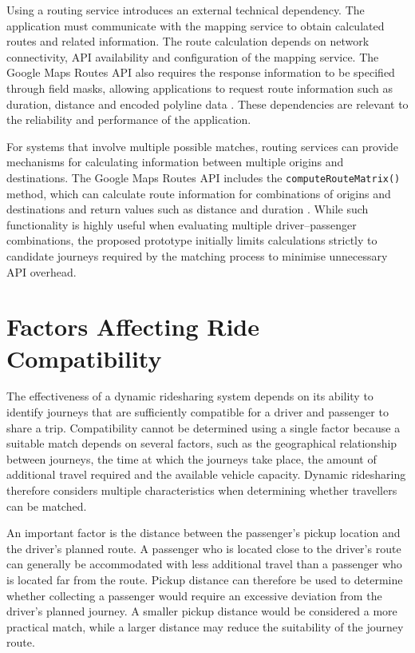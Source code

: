Using a routing service introduces an external technical dependency. The application must communicate with the mapping service to obtain calculated routes and related information. The route calculation depends on network connectivity, API availability and configuration of the mapping service. The Google Maps Routes API also requires the response information to be specified through field masks, allowing applications to request route information such as duration, distance and encoded polyline data \citep{google2026a}. These dependencies are relevant to the reliability and performance of the application.

For systems that involve multiple possible matches, routing services can provide mechanisms for calculating information between multiple origins and destinations. The Google Maps Routes API includes the \texttt{computeRouteMatrix()} method, which can calculate route information for combinations of origins and destinations and return values such as distance and duration \citep{google2026b}. While such functionality is highly useful when evaluating multiple driver--passenger combinations, the proposed prototype initially limits calculations strictly to candidate journeys required by the matching process to minimise unnecessary API overhead.

\section{Factors Affecting Ride Compatibility}
\label{sec:factors}

The effectiveness of a dynamic ridesharing system depends on its ability to identify journeys that are sufficiently compatible for a driver and passenger to share a trip. Compatibility cannot be determined using a single factor because a suitable match depends on several factors, such as the geographical relationship between journeys, the time at which the journeys take place, the amount of additional travel required and the available vehicle capacity. Dynamic ridesharing therefore considers multiple characteristics when determining whether travellers can be matched.

An important factor is the distance between the passenger's pickup location and the driver's planned route. A passenger who is located close to the driver's route can generally be accommodated with less additional travel than a passenger who is located far from the route. Pickup distance can therefore be used to determine whether collecting a passenger would require an excessive deviation from the driver's planned journey. A smaller pickup distance would be considered a more practical match, while a larger distance may reduce the suitability of the journey route.

